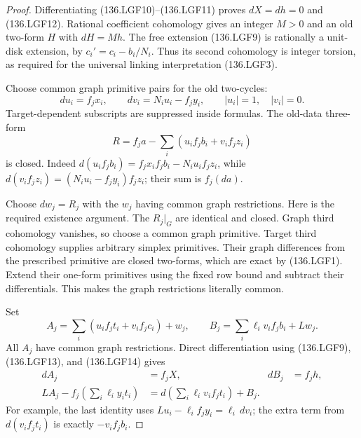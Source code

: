 \begin{proof}
Differentiating (136.LGF10)--(136.LGF11) proves \(dX=dh=0\)
and (136.LGF12). Rational coefficient cohomology gives an
integer \(M>0\) and an old two-form \(H\) with
\(dH=Mh\). The free extension (136.LGF9) is rationally a
unit-disk extension, by \(c_i'=c_i-b_i/N_i\). Thus its
second cohomology is integer torsion, as required for the
universal linking interpretation (136.LGF3).

Choose common graph primitive pairs for the old two-cycles:
\[
 du_i=f_jx_i,\qquad dv_i=N_i u_i-f_jy_i,
                         \qquad |u_i|=1,\quad |v_i|=0. \tag{136.LGF13}
\]
Target-dependent subscripts are suppressed inside formulas.
The old-data three-form
\[
 R=f_ja-\sum_i(u_i f_jb_i+v_i f_jz_i)
                                                        \tag{136.LGF14}
\]
is closed. Indeed \(d(u_i f_jb_i)=f_jx_i f_jb_i-
N_i u_i f_jz_i\), while \(d(v_i f_jz_i)=
(N_i u_i-f_jy_i)f_jz_i\); their sum is \(f_j(da)\).

Choose \(dw_j=R_j\) with the \(w_j\) having common graph
restrictions. Here is the required existence argument. The
\(R_j|_G\) are identical and closed. Graph third cohomology
vanishes, so choose a common graph primitive. Target third
cohomology supplies arbitrary simplex primitives. Their graph
differences from the prescribed primitive are closed two-forms,
which are exact by (136.LGF1). Extend their one-form primitives
using the fixed row bound and subtract their differentials.
This makes the graph restrictions literally common.

Set
\[
 A_j=\sum_i(u_i f_jt_i+v_i f_jc_i)+w_j,\qquad
 B_j=\sum_i\ell_i v_i f_jb_i+Lw_j.
                                                        \tag{136.LGF15}
\]
All \(A_j\) have common graph restrictions. Direct differentiation
using (136.LGF9), (136.LGF13), and (136.LGF14) gives
\[
\begin{aligned}
 dA_j&=f_jX,& dB_j&=f_jh,\\
 LA_j-f_j\left(\sum_i\ell_i y_i t_i\right)
   &=d\left(\sum_i\ell_i v_i f_jt_i\right)+B_j.
\end{aligned}                                         \tag{136.LGF16}
\]
For example, the last identity uses
\(L u_i-\ell_i f_jy_i=\ell_i\,dv_i\);
the extra term from \(d(v_i f_jt_i)\) is exactly
\(-v_i f_jb_i\).


\end{proof}
